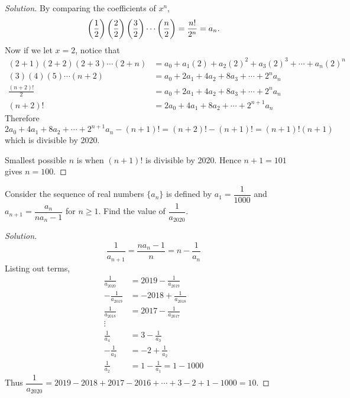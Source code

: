 \begin{proof}[Solution]
By comparing the coefficients of $x^n$,
\[ \left(\frac{1}{2}\right)\left(\frac{2}{2}\right)\left(\frac{3}{2}\right)\cdots\left(\frac{n}{2}\right) = \frac{n!}{2^n} = a_n. \]
Now if we let $x=2$, notice that
\begin{align*}
(2+1)(2+2)(2+3)\cdots(2+n) &= a_0+a_1(2)+a_2(2)^2+a_3(2)^3+\cdots+a_n(2)^n \\
(3)(4)(5)\cdots(n+2) &= a_0+2a_1+4a_2+8a_3+\cdots+2^na_n \\
\frac{(n+2)!}{2} &= a_0+2a_1+4a_2+8a_3+\cdots+2^na_n \\
(n+2)! &= 2a_0+4a_1+8a_2+\cdots+2^{n+1}a_n
\end{align*}
Therefore
\[ 2a_0+4a_1+8a_2+\cdots+2^{n+1}a_n-(n+1)!=(n+2)!-(n+1)!=(n+1)!(n+1) \]
which is divisible by 2020.

Smallest possible $n$ is when $(n+1)!$ is divisible by 2020. 
Hence $n+1=101$ gives $\boxed{n=100}$.
\end{proof}
\pagebreak

\begin{prbm}
Consider the sequence of real numbers $\{a_n\}$ is defined by $a_1=\dfrac{1}{1000}$ and $a_{n+1}=\dfrac{a_n}{na_n-1}$ for $n\ge 1$. Find the value of $\dfrac{1}{a_{2020}}$.
\end{prbm}

\begin{proof}[Solution]
\[ \frac{1}{a_{n+1}} = \frac{na_n-1}{n} = n-\frac{1}{a_n} \]
Listing out terms,
\begin{align*}
\frac{1}{a_{2020}} &= 2019 - \frac{1}{a_{2019}} \\
-\frac{1}{a_{2019}} &= -2018 + \frac{1}{a_{2018}} \\
\frac{1}{a_{2018}} &= 2017 - \frac{1}{a_{2017}} \\
\vdots& \\
\frac{1}{a_4} &= 3 - \frac{1}{a_3} \\
-\frac{1}{a_3} &= -2 + \frac{1}{a_2} \\
\frac{1}{a_2} &= 1-\frac{1}{a_1}=1-1000
\end{align*}
Thus $\dfrac{1}{a_{2020}}=2019-2018+2017-2016+\cdots+3-2+1-1000=\boxed{10}$.
\end{proof}
\pagebreak

